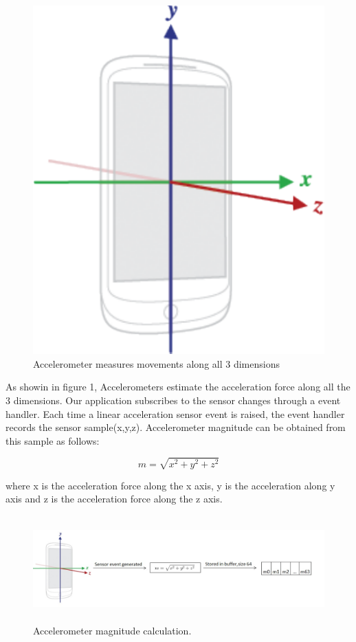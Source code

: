 \documentclass[conference]{IEEEtran}
\begin{document}
\begin{figure}[H]
\centering
\includegraphics{axis_device.pdf}
\caption{Accelerometer measures movements along all 3 dimensions}
\end{figure}

As showin in figure 1, Accelerometers estimate the acceleration force along all the 3 dimensions. Our application subscribes to the sensor changes through a event handler. Each time a linear acceleration sensor event is raised, the event handler records the sensor sample(x,y,z). Accelerometer magnitude can be obtained from this sample as follows:

\begin{equation}
m = \sqrt{x^2+y^2+z^2}
\end{equation} 

where x is the acceleration force along the x axis, y is the acceleration along y axis and z is the acceleration force along the z axis.


\begin{figure}
\centering
  \includegraphics[width=6in,height=1.6in]{sensor_to_buffer.pdf}
  \caption{Accelerometer magnitude calculation.}
\end{figure}
\end{document}
